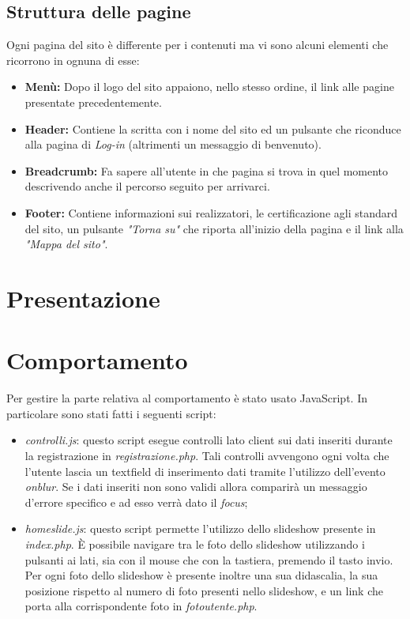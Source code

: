 	\subsection{Struttura delle pagine}
	Ogni pagina del sito è differente per i contenuti ma vi sono alcuni elementi che ricorrono in ognuna di esse:
	\begin{itemize}
	\item \textbf{Menù:}  Dopo il logo del sito appaiono, nello stesso ordine, il link alle pagine presentate precedentemente.
	\item \textbf{Header:} Contiene la scritta con i nome del sito ed un pulsante che riconduce alla pagina di \textit{Log-in} (altrimenti un messaggio di benvenuto).
	\item \textbf{Breadcrumb:} Fa sapere all'utente in che pagina si trova in quel momento descrivendo anche il percorso seguito per arrivarci. 
	\item \textbf{Footer:} Contiene informazioni sui realizzatori, le certificazione agli standard del sito, un pulsante \textit{"Torna su"} che riporta all'inizio della pagina e il link alla \textit{"Mappa del sito"}.
	\end{itemize}
	 
	\section{Presentazione}	
	\section{Comportamento}
	Per gestire la parte relativa al comportamento è stato usato JavaScript. In particolare sono stati fatti i seguenti script:
	\begin{itemize}
	\item \textit{controlli.js}: questo script esegue controlli lato client sui dati inseriti durante la registrazione in \textit{registrazione.php}. Tali controlli avvengono ogni volta che l'utente lascia un textfield di inserimento dati tramite l'utilizzo dell'evento \textit{onblur}. Se i dati inseriti non sono validi allora comparirà un messaggio d'errore specifico e ad esso verrà dato il \textit{focus};
	\item \textit{homeslide.js}: questo script permette l'utilizzo dello slideshow presente in \textit{index.php}. È possibile navigare tra le foto dello slideshow utilizzando i pulsanti ai lati, sia con il mouse che con la tastiera, premendo il tasto invio. Per ogni foto dello slideshow è presente inoltre una sua didascalia, la sua posizione rispetto al numero di foto presenti nello slideshow, e un link che porta alla corrispondente foto in \textit{fotoutente.php}. 
	\end{itemize}
	\newpage
